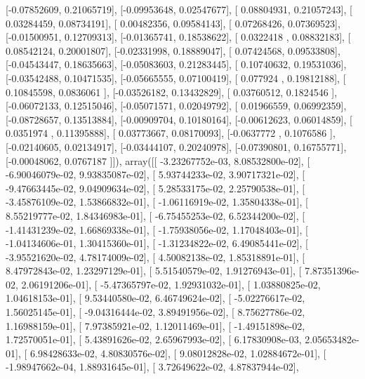 \documentclass{article}
\begin{document}
       [-0.07852609,  0.21065719],
       [-0.09953648,  0.02547677],
       [ 0.08804931,  0.21057243],
       [ 0.03284459,  0.08734191],
       [ 0.00482356,  0.09584143],
       [ 0.07268426,  0.07369523],
       [-0.01500951,  0.12709313],
       [-0.01365741,  0.18538622],
       [ 0.0322418 ,  0.08832183],
       [ 0.08542124,  0.20001807],
       [-0.02331998,  0.18889047],
       [ 0.07424568,  0.09533808],
       [-0.04543447,  0.18635663],
       [-0.05083603,  0.21283445],
       [ 0.10740632,  0.19531036],
       [-0.03542488,  0.10471535],
       [-0.05665555,  0.07100419],
       [ 0.077924  ,  0.19812188],
       [ 0.10845598,  0.0836061 ],
       [-0.03526182,  0.13432829],
       [ 0.03760512,  0.1824546 ],
       [-0.06072133,  0.12515046],
       [-0.05071571,  0.02049792],
       [ 0.01966559,  0.06992359],
       [-0.08728657,  0.13513884],
       [-0.00909704,  0.10180164],
       [-0.00612623,  0.06014859],
       [ 0.0351974 ,  0.11395888],
       [ 0.03773667,  0.08170093],
       [-0.0637772 ,  0.1076586 ],
       [-0.02140605,  0.02134917],
       [-0.03444107,  0.20240978],
       [-0.07390801,  0.16755771],
       [-0.00048062,  0.0767187 ]]), array([[ -3.23267752e-03,   8.08532800e-02],
       [ -6.90046079e-02,   9.93835087e-02],
       [  5.93744233e-02,   3.90717321e-02],
       [ -9.47663445e-02,   9.04909634e-02],
       [  5.28533175e-02,   2.25790538e-01],
       [ -3.45876109e-02,   1.53866832e-01],
       [ -1.06116919e-02,   1.35804338e-01],
       [  8.55219777e-02,   1.84346983e-01],
       [ -6.75455253e-02,   6.52344200e-02],
       [ -1.41431239e-02,   1.66869338e-01],
       [ -1.75938056e-02,   1.17048403e-01],
       [ -1.04134606e-01,   1.30415360e-01],
       [ -1.31234822e-02,   6.49085441e-02],
       [ -3.95521620e-02,   4.78174009e-02],
       [  4.50082138e-02,   1.85318891e-01],
       [  8.47972843e-02,   1.23297129e-01],
       [  5.51540579e-02,   1.91276943e-01],
       [  7.87351396e-02,   2.06191206e-01],
       [ -5.47365797e-02,   1.92931032e-01],
       [  1.03880825e-02,   1.04618153e-01],
       [  9.53440580e-02,   6.46749624e-02],
       [ -5.02276617e-02,   1.56025145e-01],
       [ -9.04316444e-02,   3.89491956e-02],
       [  8.75627786e-02,   1.16988159e-01],
       [  7.97385921e-02,   1.12011469e-01],
       [ -1.49151898e-02,   1.72570051e-01],
       [  5.43891626e-02,   2.65967993e-02],
       [  6.17830908e-03,   2.05653482e-01],
       [  6.98428633e-02,   4.80830576e-02],
       [  9.08012828e-02,   1.02884672e-01],
       [ -1.98947662e-04,   1.88931645e-01],
       [  3.72649622e-02,   4.87837944e-02],
\end{document}
